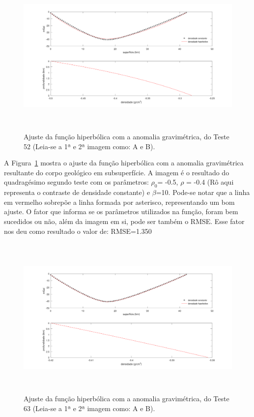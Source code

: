         \begin{figure}[!h]  
        \centering
        \includegraphics[height=8cm]{figure/Imagens 1a questao/teste52.png}
        \caption{Ajuste da função hiperbólica com a anomalia gravimétrica, do Teste 52 (Leia-se a 1ª e 2ª imagem como: A e B).}
        \label{Figura 3}
        \end{figure}
        
 A Figura~\ref{Figura 3} mostra o ajuste da função hiperbólica com a anomalia gravimétrica resultante do corpo geológico em subsuperfície. A imagem é o resultado do quadragésimo segundo teste com os parâmetros: $\rho_0$= -0.5, $\rho$ = -0.4 (Rô aqui representa o contraste de densidade constante) e $\beta$=10.  Pode-se notar que a linha em vermelho sobrepõe a linha formada por asterisco, representando um bom ajuste. O fator que informa se os parâmetros utilizados na função, foram bem sucedidos ou não, além da imagem em si, pode ser também o RMSE. Esse fator nos deu como resultado o valor de: RMSE=1.350
 
        \begin{figure}[!h]  
        \centering
        \includegraphics[height=8cm]{figure/Imagens 1a questao/teste63.png}
        \caption{Ajuste da função hiperbólica com a anomalia gravimétrica, do Teste 63 (Leia-se a 1ª e 2ª imagem como: A e B).}
        \label{Figura 4}
        \end{figure}

